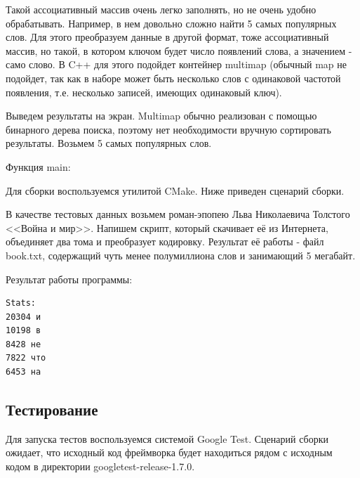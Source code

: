 

Такой ассоциативный массив очень легко заполнять, но не очень удобно обрабатывать. Например, в нем довольно сложно найти 5 самых популярных слов. Для этого преобразуем данные в другой формат, тоже ассоциативный массив, но такой, в котором ключом будет число появлений слова, а значением - само слово. В C++ для этого подойдет контейнер multimap (обычный map не подойдет, так как в наборе может быть несколько слов с одинаковой частотой появления, т.е. несколько записей, имеющих одинаковый ключ).



Выведем результаты на экран. Multimap обычно реализован с помощью бинарного дерева поиска, поэтому нет необходимости вручную сортировать результаты. Возьмем 5 самых популярных слов.



Функция main:



Для сборки воспользуемся утилитой CMake. Ниже приведен сценарий сборки.



В качестве тестовых данных возьмем роман-эпопею Льва Николаевича Толстого <<Война и мир>>. Напишем скрипт, который скачивает её из Интернета, объединяет два тома и преобразует кодировку. Результат её работы - файл book.txt, содержащий чуть менее полумиллиона слов и занимающий 5 мегабайт.



Результат работы программы:

\begin{lstlisting}
Stats: 
20304 и 
10198 в 
8428 не 
7822 что 
6453 на 
\end{lstlisting}

\subsection{Тестирование}
Для запуска тестов воспользуемся системой Google Test. Сценарий сборки ожидает, что исходный код фреймворка будет находиться рядом с исходным кодом в директории googletest-release-1.7.0.


